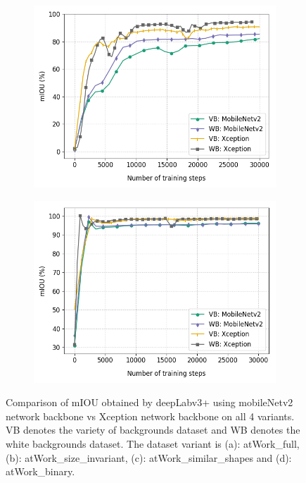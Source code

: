\begin{figure}
\begin{subfigure}{.5\textwidth}
			\includegraphics[width=1\linewidth]{images/mobxcep_shape}
			\label{backbonesc}
			\caption{}
		\end{subfigure}
		\begin{subfigure}{.5\textwidth}
			\centering
			\includegraphics[width=1\linewidth]{images/mobxcep_binary}
			\label{backbonesd}
			\caption{}
		\end{subfigure}
		\caption{Comparison of mIOU obtained by deepLabv3+ using mobileNetv2 network backbone vs Xception network backbone on all 4 variants. VB denotes the variety of backgrounds dataset and WB denotes the white backgrounds dataset. The dataset variant is (a): atWork\_full, (b): atWork\_size\_invariant, (c): atWork\_similar\_shapes and (d): atWork\_binary.}
		\label{Fig:backbones}
	\end{figure}

